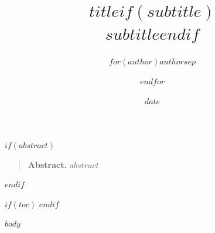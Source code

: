 \documentclass[$if(fontsize)$$fontsize$,$endif$$if(papersize)$$papersize$paper,$endif$openany]{$if(documentclass)$$documentclass$$else$book$endif$}
\title{$title$$if(subtitle)$\\\large $subtitle$$endif$}
\author{$for(author)$$author$$sep$ \and $endfor$}
\date{$date$}
\providecommand{\abstractname}{Abstract}
\newenvironment{abstract}{\small\begin{quote}\noindent\textbf{\abstractname.}\quad}{\end{quote}\normalsize}
\begin{document}
\maketitle

$if(abstract)$
\begin{abstract}
$abstract$
\end{abstract}
$endif$

$if(toc)$
\tableofcontents
\clearpage
$endif$

$body$
\end{document}
